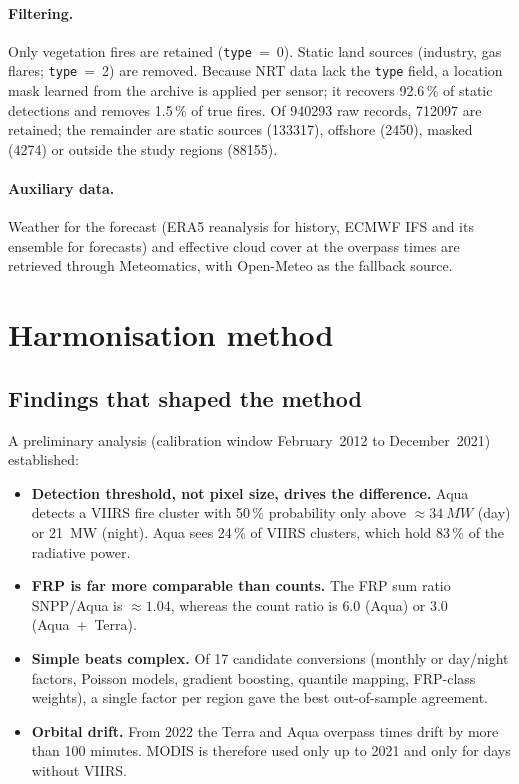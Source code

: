 \documentclass[11pt,a4paper]{article}
\begin{document}
\paragraph{Filtering.}
Only vegetation fires are retained (\texttt{type}~=~0). Static land sources (industry, gas flares;
\texttt{type}~=~2) are removed. Because NRT data lack the \texttt{type} field, a location mask learned from
the archive is applied per sensor; it recovers 92.6\,\% of static detections and removes 1.5\,\% of true
fires. Of \num{940293} raw records, \num{712097} are retained; the remainder are static sources
(\num{133317}), offshore (\num{2450}), masked (\num{4274}) or outside the study regions (\num{88155}).

\paragraph{Auxiliary data.}
Weather for the forecast (ERA5 reanalysis \cite{hersbach2020} for history, ECMWF IFS and its ensemble for
forecasts) and effective cloud cover at the overpass times are retrieved through Meteomatics, with
Open-Meteo as the fallback source.

\section{Harmonisation method}\label{sec:method}

\subsection{Findings that shaped the method}
A preliminary analysis (calibration window February~2012 to December~2021) established:
\begin{itemize}
  \item \textbf{Detection threshold, not pixel size, drives the difference.} Aqua detects a VIIRS fire
        cluster with 50\,\% probability only above $\approx\SI{34}{MW}$ (day) or \SI{21}{MW} (night). Aqua
        sees 24\,\% of VIIRS clusters, which hold 83\,\% of the radiative power.
  \item \textbf{FRP is far more comparable than counts.} The FRP sum ratio SNPP/Aqua is $\approx 1.04$,
        whereas the count ratio is $6.0$ (Aqua) or $3.0$ (Aqua~+~Terra).
  \item \textbf{Simple beats complex.} Of 17 candidate conversions (monthly or day/night factors, Poisson
        models, gradient boosting, quantile mapping, FRP-class weights), a single factor per region gave the
        best out-of-sample agreement.
  \item \textbf{Orbital drift.} From 2022 the Terra and Aqua overpass times drift by more than 100 minutes.
        MODIS is therefore used only up to 2021 and only for days without VIIRS.
\end{itemize}
\end{document}
